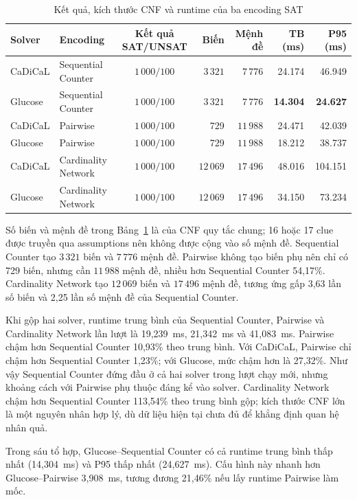 \documentclass[a4paper,fleqn]{cas-sc}
\begin{document}
\begin{table}[htbp]
\centering
\caption{Kết quả, kích thước CNF và runtime của ba encoding SAT}
\label{tab:sat-results}
\scriptsize
\begin{tabular}{@{}llcrrrr@{}}
\toprule
Solver & Encoding & Kết quả SAT/UNSAT & Biến & Mệnh đề & TB (ms) & P95 (ms)\\
\midrule
CaDiCaL & Sequential Counter   & $1\,000/100$ & $3\,321$  & $7\,776$  & 24.174 & 46.949\\
Glucose & Sequential Counter   & $1\,000/100$ & $3\,321$  & $7\,776$  & \textbf{14.304} & \textbf{24.627}\\
CaDiCaL & Pairwise             & $1\,000/100$ & 729        & $11\,988$ & 24.471 & 42.039\\
Glucose & Pairwise             & $1\,000/100$ & 729        & $11\,988$ & 18.212 & 38.737\\
CaDiCaL & Cardinality Network  & $1\,000/100$ & $12\,069$ & $17\,496$ & 48.016 & 104.151\\
Glucose & Cardinality Network  & $1\,000/100$ & $12\,069$ & $17\,496$ & 34.150 & 73.234\\
\bottomrule
\end{tabular}
\end{table}

Số biến và mệnh đề trong Bảng~\ref{tab:sat-results} là của CNF quy tắc chung; 16 hoặc 17 clue được truyền qua assumptions nên không được cộng vào số mệnh đề. Sequential Counter tạo $3\,321$ biến và $7\,776$ mệnh đề. Pairwise không tạo biến phụ nên chỉ có 729 biến, nhưng cần $11\,988$ mệnh đề, nhiều hơn Sequential Counter 54,17\%. Cardinality Network tạo $12\,069$ biến và $17\,496$ mệnh đề, tương ứng gấp 3,63 lần số biến và 2,25 lần số mệnh đề của Sequential Counter.

Khi gộp hai solver, runtime trung bình của Sequential Counter, Pairwise và Cardinality Network lần lượt là 19,239~ms, 21,342~ms và 41,083~ms. Pairwise chậm hơn Sequential Counter 10,93\% theo trung bình. Với CaDiCaL, Pairwise chỉ chậm hơn Sequential Counter 1,23\%; với Glucose, mức chậm hơn là 27,32\%. Như vậy Sequential Counter đứng đầu ở cả hai solver trong lượt chạy mới, nhưng khoảng cách với Pairwise phụ thuộc đáng kể vào solver. Cardinality Network chậm hơn Sequential Counter 113,54\% theo trung bình gộp; kích thước CNF lớn là một nguyên nhân hợp lý, dù dữ liệu hiện tại chưa đủ để khẳng định quan hệ nhân quả.

Trong sáu tổ hợp, Glucose--Sequential Counter có cả runtime trung bình thấp nhất (14,304~ms) và P95 thấp nhất (24,627~ms). Cấu hình này nhanh hơn Glucose--Pairwise 3,908~ms, tương đương 21,46\% nếu lấy runtime Pairwise làm mốc.
\end{document}
